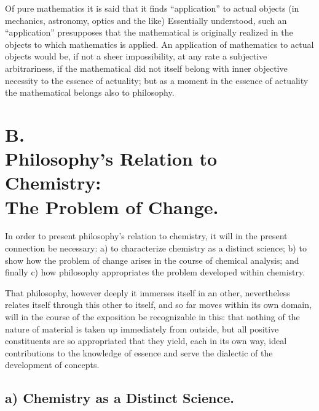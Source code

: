 \documentclass[12pt,a4paper]{book}
\begin{document}
Of pure mathematics it is said that it finds ``application'' to actual objects
(in mechanics, astronomy,
optics and the like) Essentially understood, such an ``application''
presupposes that the mathematical is originally realized in the objects to
which mathematics is applied. An application of mathematics to actual objects
would be, if not a sheer impossibility, at any rate a subjective arbitrariness,
if the mathematical did not itself belong with inner objective necessity to the
essence of actuality; but as a moment in the essence of actuality the
mathematical belongs also to philosophy.


\section*{B.\\ Philosophy's Relation to Chemistry:\\
  The Problem of Change.}


In order to present philosophy's relation to chemistry, it will in the present
connection be necessary: a) to characterize chemistry as a distinct science;
b) to show how the problem of change arises in the course of chemical analysis;
and finally c) how philosophy appropriates the problem developed within
chemistry.

That philosophy, however deeply it immerses itself in an other, nevertheless
relates itself through this other to itself, and so far moves within its own
domain, will
in the course of the exposition be recognizable in this: that nothing of the
nature of material is taken up immediately from outside, but all positive
constituents are so appropriated that they yield, each in its own way, ideal
contributions to the knowledge of essence and serve the dialectic of the
development of concepts.

\subsection*{a) Chemistry as a Distinct Science.}
\end{document}
